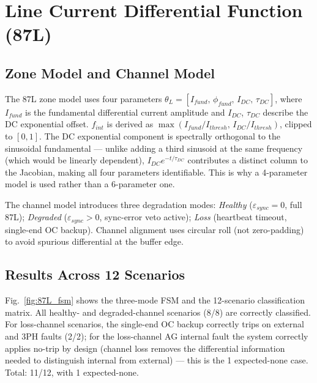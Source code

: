 \documentclass[journal,twoside,10pt]{IEEEtran}
\begin{document}
\section{Line Current Differential Function (87L)}
\label{sec:l87}

\subsection{Zone Model and Channel Model}
\label{sec:l87:model}

The 87L zone model uses four parameters
$\theta_L = [I_{fund},\,\phi_{fund},\,I_{DC},\,\tau_{DC}]$,
where $I_{fund}$ is the fundamental differential current amplitude and
$I_{DC}$, $\tau_{DC}$ describe the DC exponential offset.
$f_{int}$ is derived as $\max(I_{fund}/I_{thresh},\,I_{DC}/I_{thresh})$,
clipped to $[0,1]$.
The DC exponential component is spectrally orthogonal to the sinusoidal
fundamental — unlike adding a third sinusoid at the same frequency (which
would be linearly dependent), $I_{DC}e^{-t/\tau_{DC}}$ contributes a
distinct column to the Jacobian, making all four parameters identifiable.
This is why a 4-parameter model is used rather than a 6-parameter one.

The channel model introduces three degradation modes:
\textit{Healthy} ($\varepsilon_{sync} = 0$, full 87L);
\textit{Degraded} ($\varepsilon_{sync} > 0$, sync-error veto active);
\textit{Loss} (heartbeat timeout, single-end OC backup).
Channel alignment uses circular roll (not zero-padding) to avoid
spurious differential at the buffer edge.

\subsection{Results Across 12 Scenarios}
\label{sec:l87:results}

Fig.~\ref{fig:87L_fsm} shows the three-mode FSM and the 12-scenario
classification matrix.
All healthy- and degraded-channel scenarios (8/8) are correctly classified.
For loss-channel scenarios, the single-end OC backup correctly trips on
external and 3PH faults (2/2); for the loss-channel AG internal fault
the system correctly applies no-trip by design (channel loss removes the
differential information needed to distinguish internal from external) — this
is the 1 expected-none case. Total: 11/12, with 1 expected-none.
\end{document}

